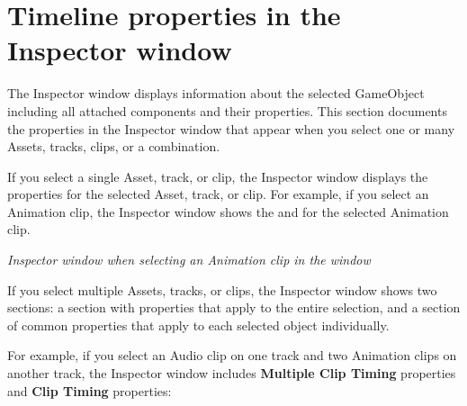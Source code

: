 \chapter{Timeline properties in the Inspector window}
\hypertarget{md__library_2_package_cache_2com_8unity_8timeline_0d1_87_86_2_documentation_0i_2insp__about}{}\label{md__library_2_package_cache_2com_8unity_8timeline_0d1_87_86_2_documentation_0i_2insp__about}
\label{md__library_2_package_cache_2com_8unity_8timeline_0d1_87_86_2_documentation_0i_2insp__about_autotoc_md1151}%
%
 The Inspector window displays information about the selected Game\+Object including all attached components and their properties. This section documents the properties in the Inspector window that appear when you select one or many  Assets, tracks, clips, or a combination.

If you select a single  Asset, track, or clip, the Inspector window displays the properties for the selected Asset, track, or clip. For example, if you select an Animation clip, the Inspector window shows the  and  for the selected Animation clip.



{\itshape Inspector window when selecting an Animation clip in the  window}

If you select multiple  Assets, tracks, or clips, the Inspector window shows two sections\+: a section with properties that apply to the entire selection, and a section of common properties that apply to each selected object individually.

For example, if you select an Audio clip on one track and two Animation clips on another track, the Inspector window includes {\bfseries{Multiple Clip Timing}} properties and {\bfseries{Clip Timing}} properties\+:


